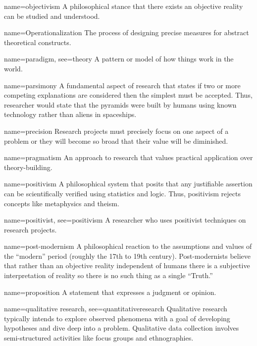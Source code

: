 {name={objectivism}}
{%
	A philosophical stance that there exists an objective reality can be studied and understood.
}


{name={Operationalization}}
{%
	 The process of designing precise measures for abstract theoretical constructs. 
}

{name={paradigm},
	see={theory}}
{%
	A pattern or model of how things work in the world. 
}

	{name={parsimony}}
	{%
		A fundamental aspect of research that states if two or more competing explanations are considered then the simplest must be accepted. Thus, researcher would state that the pyramids were built by humans using known technology rather than aliens in spaceships.
	}

	{name={precision}}
	{%
		Research projects must precisely focus on one aspect of a problem or they will become so broad that their value will be diminished.
	}

{name={pragmatism}}
{%
	An approach to research that values practical application over theory-building. 
}

{name={positivism}}
{%
	A philosophical system that posits that any justifiable assertion can be scientifically verified using statistics and logic. Thus, positivism rejects concepts like metaphysics and theism.
}

{name={positivist},
 see={positivism}}
{%
	A researcher who uses positivist techniques on research projects.
}

{name={post-modernism}}
{%
	A philosophical reaction to the assumptions and values of the ``modern'' period (roughly the 17th to 19th century). Post-modernists believe that rather than an objective reality independent of humans there is a subjective interpretation of reality so there is no such thing as a single ``Truth.''
}

{name={proposition}}
{%
	A statement that expresses a judgment or opinion.
}

{name={qualitative research},
	see={quantitativeresearch}}
{%
	Qualitative research typically intends to explore observed phenomena with a goal of developing hypotheses and dive deep into a problem. Qualitative data collection involves semi-structured activities like focus groups and ethnographies.
}

